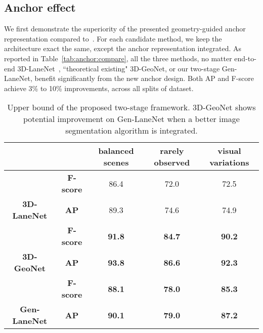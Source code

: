 \documentclass[10pt,twocolumn,letterpaper]{article}
\begin{document}
\subsection{Anchor effect}

We first demonstrate the superiority of the presented geometry-guided anchor representation compared to~\cite{Garnett:etal:ICCV2019}. For each candidate method, we keep the architecture exact the same, except the anchor representation integrated. As reported in Table~\ref{tab:anchor:compare}, all the three methods, no matter end-to-end 3D-LaneNet~\cite{Garnett:etal:ICCV2019}, ``theoretical existing" 3D-GeoNet, or our two-stage Gen-LaneNet, benefit significantly from the new anchor design. Both AP and F-score achieve 3\% to 10\% improvements, across all splits of dataset. 

\begin{table*}[]
\centering
\begin{tabular}{|c|c|c|c|c|}
\hline
\multicolumn{2}{|c|}{\textbf{}} & \textbf{balanced  scenes} & \textbf{rarely observed} & \textbf{visual variations} \\ \hline
 & \textbf{F-score} & 86.4 & 72.0 & 72.5 \\ \cline{2-5} 
\multirow{-2}{*}{\textbf{3D-LaneNet}} & \textbf{AP} & 89.3 & 74.6 & 74.9 \\ \hline
 & \textbf{F-score} & {\color[HTML]{3166FF} \textbf{91.8}} & {\color[HTML]{3166FF} \textbf{84.7}} & {\color[HTML]{3166FF} \textbf{90.2}} \\ \cline{2-5} 
\multirow{-2}{*}{\textbf{3D-GeoNet}} & \textbf{AP} & {\color[HTML]{3166FF} \textbf{93.8}} & {\color[HTML]{3166FF} \textbf{86.6}} & {\color[HTML]{3166FF} \textbf{92.3}} \\ \hline
 & \textbf{F-score} & \textbf{88.1} & \textbf{78.0} & \textbf{85.3} \\ \cline{2-5} 
\multirow{-2}{*}{\textbf{Gen-LaneNet}} & \textbf{AP} & \textbf{90.1} & \textbf{79.0} & \textbf{87.2} \\ \hline
\end{tabular}
\caption{Upper bound of the proposed two-stage framework. 3D-GeoNet shows potential improvement on Gen-LaneNet when a better image segmentation algorithm is integrated.}
\label{tab:twostage}
\end{table*}
\end{document}
